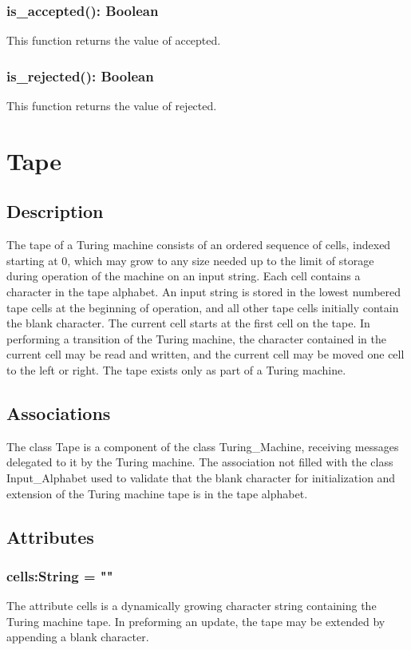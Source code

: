 \documentclass{report}
\begin{document}
     \subsubsection{ is\_accepted(): Boolean  }
     This function returns the value of accepted.
     \subsubsection{ is\_rejected(): Boolean  }
     This function returns the value of rejected.

    
    
    
    
\section{Tape}
	\subsection{Description}
    The tape of a Turing machine consists of an ordered sequence of cells, indexed starting at 0, which may grow to any size needed up to the limit of storage during operation of the machine on an input string. Each cell contains a character in the tape alphabet. An input string is stored in the lowest numbered tape cells at the beginning of operation, and all other tape cells initially contain the blank character. The current cell starts at the first cell on the tape. In performing a transition of the Turing machine, the character contained in the current cell may be read and written, and the current cell may be moved one cell to the left or right. The tape exists only as part of a Turing machine.
    \subsection{Associations} 
    The class Tape is a component of the class Turing\_Machine, receiving messages delegated to it by the Turing machine.
    The association not filled with the class Input\_Alphabet used to validate that the blank character for initialization and extension of the Turing machine tape is in the tape alphabet.
    \subsection{Attributes} 
    \subsubsection{ cells:String = "" }
    The attribute cells is a dynamically growing character string containing the Turing machine tape. In preforming an update, the tape may be extended by appending a blank character.
    
\end{document}

